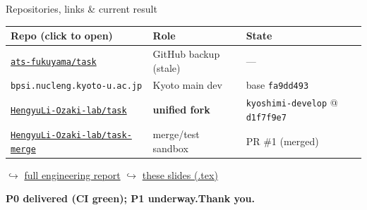 \documentclass[10pt,aspectratio=169]{beamer}
\newcommand{\good}{\textcolor{ok}{\textbf{green}}}
\begin{document}
\begin{frame}{Repositories, links \& current result}
\footnotesize
\begin{tabular}{@{}p{45mm}p{26mm}p{37mm}@{}}
\toprule
Repo (click to open) & Role & State \\
\midrule
\href{https://github.com/ats-fukuyama/task}{\texttt{ats-fukuyama/task}} & GitHub backup (stale) & --- \\
\texttt{bpsi.nucleng.kyoto-u.ac.jp} & Kyoto main dev & base \texttt{fa9dd493} \\
\href{https://github.com/HengyuLi-Ozaki-lab/task/tree/kyoshimi-develop}{\texttt{HengyuLi-Ozaki-lab/task}} & \textbf{unified fork} & \texttt{kyoshimi-develop} @ \texttt{d1f7f9e7} \\
\href{https://github.com/HengyuLi-Ozaki-lab/task-merge/pull/1}{\texttt{HengyuLi-Ozaki-lab/task-merge}} & merge/test sandbox & PR \#1 (merged) \\
\bottomrule
\end{tabular}
\vspace{0.3em}
\begin{center}\scriptsize
$\hookrightarrow$ \href{https://github.com/HengyuLi-Ozaki-lab/task/blob/kyoshimi-develop/docs/2026-06-TASK-merge-and-TRX-report.md}{full engineering report}\quad
$\hookrightarrow$ \href{https://github.com/HengyuLi-Ozaki-lab/task/tree/kyoshimi-develop/docs/presentations}{these slides (.tex)}
\end{center}
\vspace{0.3em}
\begin{center}
\end{center}
\vspace{0.3em}
\begin{center}\large\textbf{P0 delivered (CI \good{}); P1 underway.}\qquad\Large\textbf{Thank you.}\end{center}
\end{frame}
\end{document}
